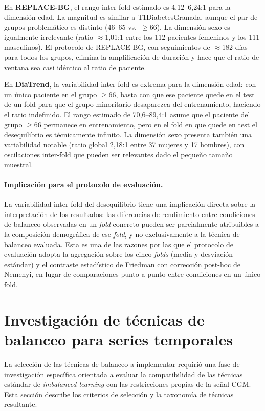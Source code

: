 En \textbf{REPLACE-BG}, el rango inter-fold estimado es 4{,}12–6{,}24:1 para la dimensión edad. La magnitud es similar a T1DiabetesGranada, aunque el par de grupos problemático es distinto (46–65 vs.\ $\geq$66). La dimensión sexo es igualmente irrelevante (ratio ${\approx}$1{,}01:1 entre los 112 pacientes femeninos y los 111 masculinos). El protocolo de REPLACE-BG, con seguimientos de ${\approx}$182 días para todos los grupos, elimina la amplificación de duración y hace que el ratio de ventana sea casi idéntico al ratio de paciente.

En \textbf{DiaTrend}, la variabilidad inter-fold es extrema para la dimensión edad: con un único paciente en el grupo $\geq$66, basta con que ese paciente quede en el test de un fold para que el grupo minoritario desaparezca del entrenamiento, haciendo el ratio indefinido. El rango estimado de 70{,}6–89{,}4:1 asume que el paciente del grupo $\geq$66 permanece en entrenamiento, pero en el fold en que quede en test el desequilibrio es técnicamente infinito. La dimensión sexo presenta también una variabilidad notable (ratio global 2{,}18:1 entre 37 mujeres y 17 hombres), con oscilaciones inter-fold que pueden ser relevantes dado el pequeño tamaño muestral.

\paragraph{Implicación para el protocolo de evaluación.}
La variabilidad inter-fold del desequilibrio tiene una implicación directa sobre la interpretación de los resultados: las diferencias de rendimiento entre condiciones de balanceo observadas en un \textit{fold} concreto pueden ser parcialmente atribuibles a la composición demográfica de ese \textit{fold}, y no exclusivamente a la técnica de balanceo evaluada. Esta es una de las razones por las que el protocolo de evaluación adopta la agregación sobre los cinco \textit{folds} (media y desviación estándar) y el contraste estadístico de Friedman con corrección post-hoc de Nemenyi, en lugar de comparaciones punto a punto entre condiciones en un único fold.


\section{Investigación de técnicas de balanceo para series temporales}
\label{sec:investigacion_tecnicas}
La selección de las técnicas de balanceo a implementar requirió una fase de investigación específica orientada a evaluar la compatibilidad de las técnicas estándar de \emph{imbalanced learning} con las restricciones propias de la señal CGM. Esta sección describe los criterios de selección y la taxonomía de técnicas resultante.

